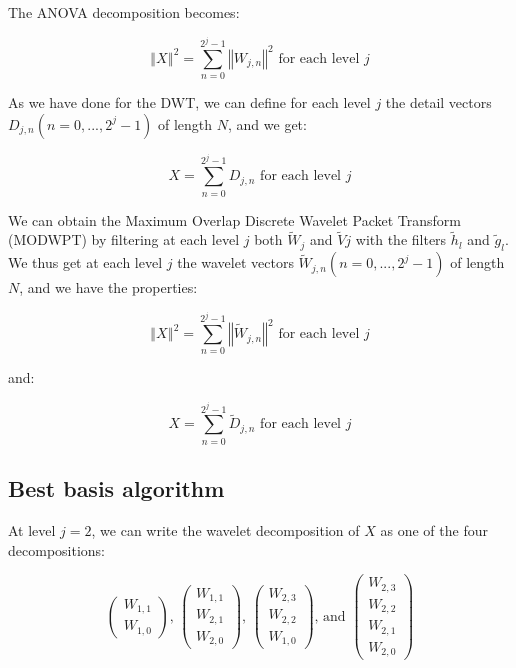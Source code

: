 \documentclass[workdone.tex]{subfiles}
\begin{document}
The ANOVA decomposition becomes:

\begin{equation}
\left\Vert X \right\Vert ^2 = \sum_{n = 0}^{2^j - 1} \left\Vert W_{j,n} \right\Vert ^2 \text{ for each level } j
\end{equation}

As we have done for the DWT, we can define for each level $j$ the detail vectors $D_{j,n} \left( n = 0 , ... , 2^j - 1 \right)$ of length $N$, and we get:

\begin{equation}
X = \sum_{n = 0}^{2^j - 1} D_{j,n} \text{ for each level } j
\end{equation}

We can obtain the Maximum Overlap Discrete Wavelet Packet Transform (MODWPT) by filtering at each level $j$ both $\widetilde{W}_j$ and $\widetilde{V}j$ with the filters $\widetilde{h}_l$ and $\widetilde{g}_l$. We thus get at each level $j$ the wavelet vectors $\widetilde{W}_{j,n} \left(n = 0 , ... , 2^j - 1 \right)$ of length $N$, and we have the properties:

\begin{equation}
\left\Vert X \right\Vert ^2 = \sum_{n = 0}^{2^j - 1} \left\Vert \widetilde{W}_{j,n} \right\Vert ^2 \text{ for each level } j
\end{equation}

and:

\begin{equation}
X = \sum_{n = 0}^{2^j - 1} \widetilde{D}_{j,n} \text{ for each level } j
\end{equation}

\subsection{Best basis algorithm}

At level $j = 2$, we can write the wavelet decomposition of $X$ as one of the four decompositions:

\begin{equation}
\begin{pmatrix}
W_{1,1} \\
W_{1,0}
\end{pmatrix} \text{, } \begin{pmatrix}
W_{1,1} \\
W_{2,1} \\
W_{2,0}
\end{pmatrix} \text{, } \begin{pmatrix}
W_{2,3} \\
W_{2,2} \\
W_{1,0}
\end{pmatrix} \text{, and } \begin{pmatrix}
W_{2,3} \\
W_{2,2} \\
W_{2,1} \\
W_{2,0}
\end{pmatrix}
\end{equation}
\end{document}
